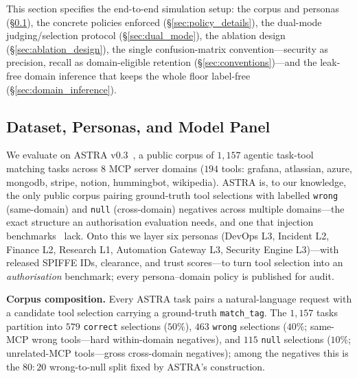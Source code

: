 \documentclass[sigconf,review,anonymous]{acmart}
\begin{document}
This section specifies the end-to-end simulation setup: the corpus and personas (\S\ref{sec:dataset}), the concrete policies enforced (\S\ref{sec:policy_details}), the dual-mode judging/selection protocol (\S\ref{sec:dual_mode}), the ablation design (\S\ref{sec:ablation_design}), the single confusion-matrix convention---security as precision, recall as domain-eligible retention (\S\ref{sec:conventions})---and the leak-free domain inference that keeps the whole floor label-free (\S\ref{sec:domain_inference}).

\subsection{Dataset, Personas, and Model Panel}
\label{sec:dataset}
\label{sec:model_panel}

We evaluate on ASTRA v0.3~\cite{elhelou2025astra}, a public corpus of $1{,}157$ agentic task-tool matching tasks across $8$ MCP server domains ($194$ tools: grafana, atlassian, azure, mongodb, stripe, notion, hummingbot, wikipedia). ASTRA is, to our knowledge, the only public corpus pairing ground-truth tool selections with labelled \texttt{wrong} (same-domain) and \texttt{null} (cross-domain) negatives across multiple domains---the exact structure an authorisation evaluation needs, and one that injection benchmarks~\cite{zhan2024injecagent,debenedetti2024agentdojo,ruan2024toolemu} lack. Onto this we layer six personas (DevOps L3, Incident L2, Finance L2, Research L1, Automation Gateway L3, Security Engine L3)---with released SPIFFE IDs, clearance, and trust scores---to turn tool selection into an \emph{authorisation} benchmark; every persona--domain policy is published for audit.

\textbf{Corpus composition.} Every ASTRA task pairs a natural-language request with a candidate tool selection carrying a ground-truth \texttt{match\_tag}. The $1{,}157$ tasks partition into $579$ \texttt{correct} selections ($50\%$), $463$ \texttt{wrong} selections ($40\%$; same-MCP wrong tools---hard within-domain negatives), and $115$ \texttt{null} selections ($10\%$; unrelated-MCP tools---gross cross-domain negatives); among the negatives this is the $80{:}20$ wrong-to-null split fixed by ASTRA's construction.
\end{document}
